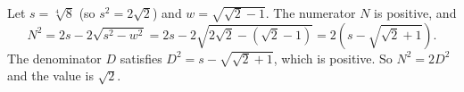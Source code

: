 Let $s=\sqrt[4]8$ (so $s^2=2\sqrt2$) and $w=\sqrt{\sqrt2-1}$. The numerator $N$ is positive, and
\[N^2=2s-2\sqrt{s^2-w^2}=2s-2\sqrt{2\sqrt2-\left(\sqrt2-1\right)}=2\left(s-\sqrt{\sqrt2+1}\right).\]
The denominator $D$ satisfies $D^2=s-\sqrt{\sqrt2+1}$, which is positive. So $N^2=2D^2$ and the value is $\boxed{\sqrt2}$.
